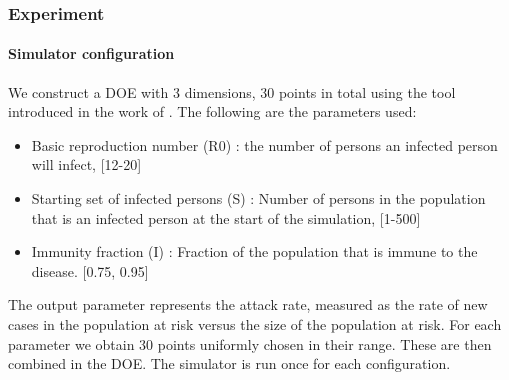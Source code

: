 
\subsubsection{Experiment}
\paragraph{Simulator configuration}
We construct a DOE with 3 dimensions, 30 points in total using the tool introduced in the work of \citep{DOE}. 
The following are the parameters used:
\begin{itemize}
\item Basic reproduction number (R0) : the number of persons an infected person will infect, [12-20]
\item Starting set of infected persons (S) : Number of persons in the population that is an infected person at the start of the simulation, [1-500]
\item Immunity fraction (I) : Fraction of the population that is immune to the disease. [0.75, 0.95]
\end{itemize}
The output parameter represents the attack rate, measured as the rate of new cases in the population at risk versus the size of the population at risk.
For each parameter we obtain 30 points uniformly chosen in their range. These are then combined in the DOE.
The simulator is run once for each configuration. 
